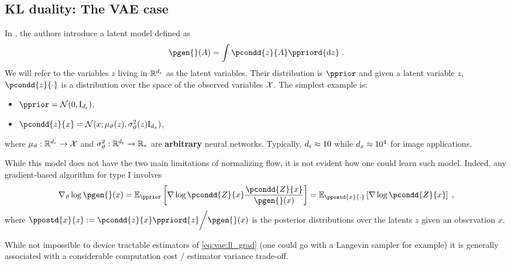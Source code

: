 \subsection{KL duality: The VAE case}
\label{sec:gen:vae}
In \cite{kingma2013autoencoding}, the authors introduce a latent model defined as
\begin{equation}
    \label{eq:vae_def}
    \pgen{}(A) = \int \pcondd{z}{A} \ppriord{\rmd z} \eqsp.
\end{equation}
We will refer to the variables $z$ living in $\mathbb{R}^{d_{\epsilon}}$ as the latent variables. Their distribution is $\pprior$ and 
given a latent variable $z$, $\pcondd{z}{\cdot}$ is a distribution over the space of the observed variables $\mathcal{X}$.
The simplest example is:
\begin{itemize}
    \item $\pprior = \gauss(0, \idm_{\gendim})$,
    \item $\pcondd{z}{x} = \gauss(x; \mu_{\paramcond}(z), \sigma^2_\paramcond(z) \idm_{\statedim})$,
\end{itemize}
where $\mu_{\vartheta}: \mathbb{R}^{d_{\epsilon}} \rightarrow \mathcal{X}$ and $\sigma^2_\vartheta: \mathbb{R}^{d_{\epsilon}} \rightarrow \mathbb{R}_*$ are \textbf{arbitrary} neural networks.
Typically, $d_{\epsilon} \approx 10$ while ${d_x} \approx 10^4$ for image applications.

While this model does not have the two main limitations of normalizing flow, it is not evident how one could learn such model.
Indeed, any gradient-based algorithm for type I involves
\begin{equation}
    \label{eq:vae:ll_grad}
    \nabla_{\paramcond} \log \pgen{}(\lstate) = \PE{\pprior}{\nabla \log \pcondd{Z}{\lstate}\frac{\pcondd{Z}{\lstate}}{\pgen{}(\lstate)}} = \PE{\ppostd{\lstate}{\cdot}}{\nabla \log \pcondd{Z}{\lstate}}  \eqsp,
\end{equation}
where $\ppostd{\lstate}{z} \eqdef \nofrac{\pcondd{z}{\lstate}\ppriord{z}}{\pgen{}(\lstate)}$ is the posterior distributions over the latents $z$ given an observation $x$.

While not impossible to device tractable estimators of \eqref{eq:vae:ll_grad} (one could go with a Langevin sampler for example)
it is generally associated with a considerable computation cost / estimator variance trade-off.


